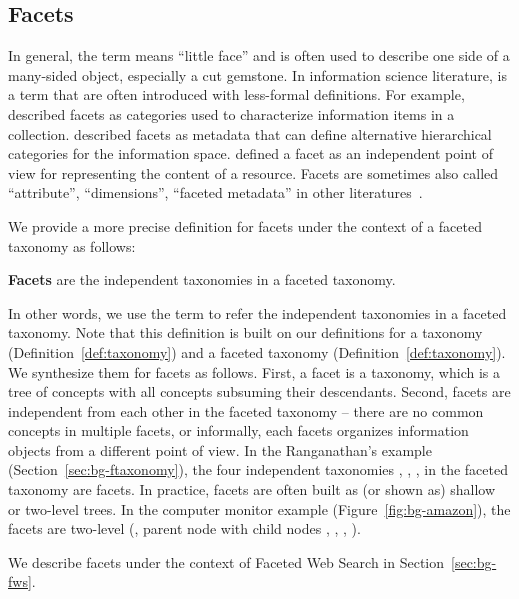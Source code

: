 \subsection{Facets}
\label{sec:bg-facet}
In general, the term  means ``little face'' and is often used to describe one side of a many-sided object, especially a cut gemstone. In information science literature,  is a  term that are often introduced with less-formal definitions. For example, \citet{hearst2006design} described facets as categories used to characterize information items in a collection. \citet{koren2008personalized} described facets as metadata that can define alternative hierarchical categories for the information space. \citet{bonino2009faset} defined a facet as an independent point of view for representing the content of a resource. Facets are sometimes also called ``attribute'', ``dimensions'', ``faceted metadata'' in other literatures~\cite{teevan2008challenges,li2010facetedpedia,yee2003faceted}.

We provide a more precise definition for facets under the context of a faceted taxonomy as follows:
\begin{definition}
\label{def:facet}
 \textbf{Facets} are the independent taxonomies in a faceted taxonomy.
\end{definition}
\noindent In other words, we use the term  to refer the independent taxonomies in a faceted taxonomy. Note that this definition is built on our definitions for a taxonomy (Definition~\ref{def:taxonomy}) and a faceted taxonomy (Definition~\ref{def:taxonomy}). We synthesize them for facets as follows. First, a facet is a taxonomy, which is a tree of concepts with all concepts subsuming their descendants. Second, facets are independent from each other in the faceted taxonomy -- there are no common concepts in multiple facets, or informally, each facets organizes information objects from a different point of view. In the Ranganathan's example (Section~\ref{sec:bg-ftaxonomy}), the four independent taxonomies , , ,  in the faceted taxonomy are facets. 
In practice, facets are often built as (or shown as) shallow or two-level trees. In the computer monitor example (Figure~\ref{fig:bg-amazon}), the facets are two-level (\eg, parent node  with child nodes , , , ).

We describe facets under the context of Faceted Web Search in Section~\ref{sec:bg-fws}.


